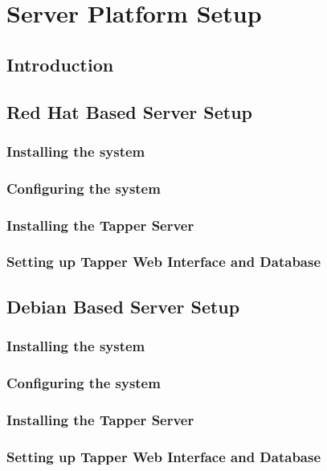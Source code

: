 \chapter{\cernvmreleasetesting Server Platform Setup}
\label{sct:serversetup}

\section{Introduction}

\section{Red Hat Based Server Setup}
\subsection{Installing the system}
\subsection{Configuring the system}
\subsection{Installing the Tapper Server}
\subsection{Setting up Tapper Web Interface and Database}

\section{Debian Based Server Setup}
\subsection{Installing the system}
\subsection{Configuring the system}
\subsection{Installing the Tapper Server}
\subsection{Setting up Tapper Web Interface and Database}